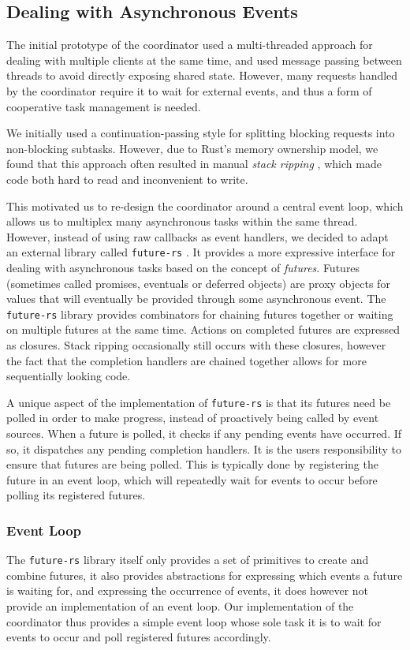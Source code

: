 \subsection{Dealing with Asynchronous Events}
The initial prototype of the coordinator used a multi-threaded approach for dealing
with multiple clients at the same time, and used message passing between threads
to avoid directly exposing shared state. However, many requests handled by
the coordinator require it to wait for external events, and thus a form of
cooperative task management is needed.

We initially used a continuation-passing style for splitting blocking requests into
non-blocking subtasks. However, due to Rust's memory ownership model, we found that
this approach often resulted in manual \emph{stack ripping} \cite{stackmgmt},
which made code both hard to read and inconvenient to write.

This motivated us to re-design the coordinator around a central event loop, which
allows us to multiplex many asynchronous tasks within the same thread. However,
instead of using raw callbacks as event handlers, we decided to adapt an external
library called \lstinline{future-rs} \cite{futuresrs}. It provides a more expressive interface
for dealing with asynchronous tasks based on the concept of \emph{futures}. Futures
(sometimes called promises, eventuals or deferred objects) are proxy objects for
values that will eventually be provided through some asynchronous event.
The \lstinline{future-rs} library provides combinators for chaining futures
together or waiting on multiple futures at the same time. Actions on completed
futures are expressed as closures. Stack ripping occasionally still occurs
with these closures, however the fact that the completion handlers are chained together
allows for more sequentially looking code.

A unique aspect of the implementation of \lstinline{future-rs} is that its futures
need be polled in order to make progress, instead of proactively being called
by event sources. When a future is polled, it checks if any pending events
have occurred. If so, it dispatches any pending completion handlers. 
It is the users responsibility to ensure that futures are being
polled. This is typically done by registering the future in an event loop,
which will repeatedly wait for events to occur before polling its registered
futures.

\subsubsection{Event Loop}
The \lstinline{future-rs} library itself only provides a set of primitives to
create and combine futures, it also provides abstractions for expressing which
events a future is waiting for, and expressing the occurrence of events, it
does however not provide an implementation of an event loop. Our implementation
of the coordinator thus provides a simple event loop whose sole task it is
to wait for events to occur and poll registered futures accordingly.

